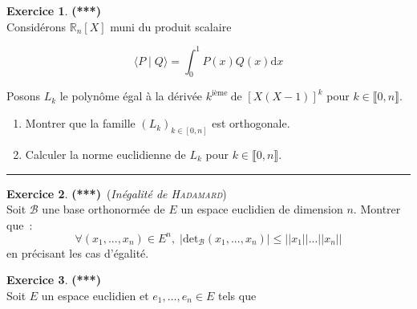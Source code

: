 \documentclass[a4paper,11pt]{article}
\theoremstyle{definition}
\newtheorem{exo}{Exercice} %
\begin{document}
\begin{minipage}{1\linewidth}\begin{minipage}[t]{0.48\linewidth}\raggedright
		
		\begin{exo}\textbf{(***)}\quad\\[0.2cm]
			Considérons $\mathbb{R}_{n}[X]$ muni du produit scalaire
			
			$$
			\langle P \mid Q\rangle=\int_{0}^{1} P(x) Q(x) \mathrm{d} x
			$$
			
			Posons $L_{k}$ le polynôme égal à la dérivée $k^{\text {ième }} \text{de }[X(X-1)]^{k}$ pour $k \in \llbracket 0, n \rrbracket$.
			\begin{enumerate}
				\item Montrer que la famille $\left(L_{k}\right)_{k \in[0, n]}$ est orthogonale. 
				\item Calculer la norme euclidienne de $L_{k}$ pour $k \in \llbracket 0, n \rrbracket$.
			\end{enumerate}
			
			\centering\rule{1\linewidth}{0.6pt}\end{exo}	
		
		
		\begin{exo}\textbf{(***)}\quad\ (\textit{Inégalité de \textsc{Hadamard}})\\[0.2cm]
			Soit $\mathcal{B}$ une base orthonormée de $E$ un espace euclidien de dimension $n$.
			Montrer que~:~$$\forall(x_1,...,x_n)\in E^n,\;|\mbox{det}_{\mathcal{B}}(x_1,...,x_n)|\leq||x_1||...||x_n||$$
			 en précisant les cas d'égalité.
			
		\end{exo}
		
	
		
		
		
		
		
		
		
		
	\end{minipage}\hfill\vrule\hfill\begin{minipage}[t]{0.48\linewidth}\raggedright

		
		\begin{exo}\textbf{(***)}\quad\\[0.2cm]
			Soit $E$ un espace euclidien et $e_{1}, \ldots, e_{n} \in E$ tels que
			

\end{exo}
\end{minipage}
\end{minipage}
\end{document}
